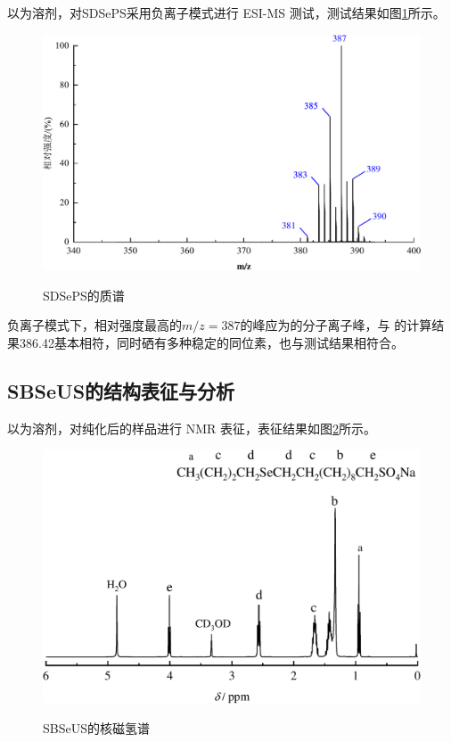 \documentclass[bachelor,fandolfonts,replaceperiod]{jnuthesis}
\begin{document}
    以为溶剂，对SDSePS采用负离子模式进行 ESI-MS 测试，测试结果如图\ref{fig:SDSePS-mass}所示。
     \begin{figure}[htbp]
        \centering
        \includegraphics[width=.8\textwidth]{figure/SDSePS-mass.pdf}\\
        \caption{SDSePS的质谱}\label{fig:SDSePS-mass}
    \end{figure}
    
    负离子模式下，相对强度最高的$m/z = 387$的峰应为的分子离子峰，与
    的计算结果386.42基本相符，同时硒有多种稳定的同位素，也与测试结果相符合。
    
    \subsection{SBSeUS的结构表征与分析}
        以为溶剂，对纯化后的样品进行     NMR 表征，表征结果如图\ref{fig:SBSeUS-nmr}所示。
    \begin{figure}[htbp]
        \centering
        \includegraphics[width=.75\textwidth]{figure/SBSeUS-nmr.pdf}\\
        \caption{SBSeUS的核磁氢谱}\label{fig:SBSeUS-nmr}
    \end{figure}
    
\end{document}
